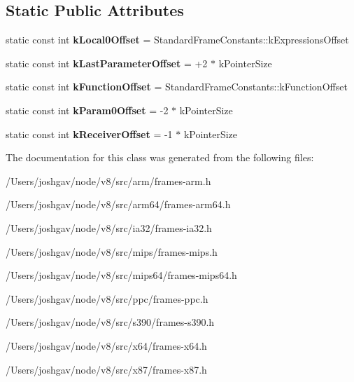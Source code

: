 \subsection*{Static Public Attributes}
\begin{DoxyCompactItemize}
\item 
static const int {\bfseries k\+Local0\+Offset} = Standard\+Frame\+Constants\+::k\+Expressions\+Offset\hypertarget{classv8_1_1internal_1_1_java_script_frame_constants_ad5f6058185016ce289f43a9fdec4b3a7}{}\label{classv8_1_1internal_1_1_java_script_frame_constants_ad5f6058185016ce289f43a9fdec4b3a7}

\item 
static const int {\bfseries k\+Last\+Parameter\+Offset} = +2 $\ast$ k\+Pointer\+Size\hypertarget{classv8_1_1internal_1_1_java_script_frame_constants_a4c1637c6c343dc8552738899f22c6f2a}{}\label{classv8_1_1internal_1_1_java_script_frame_constants_a4c1637c6c343dc8552738899f22c6f2a}

\item 
static const int {\bfseries k\+Function\+Offset} = Standard\+Frame\+Constants\+::k\+Function\+Offset\hypertarget{classv8_1_1internal_1_1_java_script_frame_constants_ae88c16c400d599ef911d7170adf9d635}{}\label{classv8_1_1internal_1_1_java_script_frame_constants_ae88c16c400d599ef911d7170adf9d635}

\item 
static const int {\bfseries k\+Param0\+Offset} = -\/2 $\ast$ k\+Pointer\+Size\hypertarget{classv8_1_1internal_1_1_java_script_frame_constants_a3bca59435d9f9f546caaa3b93e22442f}{}\label{classv8_1_1internal_1_1_java_script_frame_constants_a3bca59435d9f9f546caaa3b93e22442f}

\item 
static const int {\bfseries k\+Receiver\+Offset} = -\/1 $\ast$ k\+Pointer\+Size\hypertarget{classv8_1_1internal_1_1_java_script_frame_constants_acbc2c4ddf74f2ecb4d73bba526e769fb}{}\label{classv8_1_1internal_1_1_java_script_frame_constants_acbc2c4ddf74f2ecb4d73bba526e769fb}

\end{DoxyCompactItemize}


The documentation for this class was generated from the following files\+:\begin{DoxyCompactItemize}
\item 
/\+Users/joshgav/node/v8/src/arm/frames-\/arm.\+h\item 
/\+Users/joshgav/node/v8/src/arm64/frames-\/arm64.\+h\item 
/\+Users/joshgav/node/v8/src/ia32/frames-\/ia32.\+h\item 
/\+Users/joshgav/node/v8/src/mips/frames-\/mips.\+h\item 
/\+Users/joshgav/node/v8/src/mips64/frames-\/mips64.\+h\item 
/\+Users/joshgav/node/v8/src/ppc/frames-\/ppc.\+h\item 
/\+Users/joshgav/node/v8/src/s390/frames-\/s390.\+h\item 
/\+Users/joshgav/node/v8/src/x64/frames-\/x64.\+h\item 
/\+Users/joshgav/node/v8/src/x87/frames-\/x87.\+h\end{DoxyCompactItemize}
